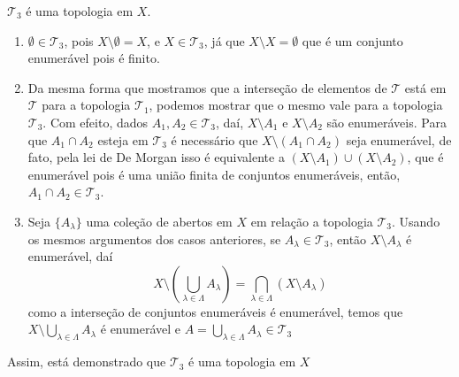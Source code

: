 \documentclass[a4paper, 11pt]{article}
\newcommand{\cT}{\mathcal T}
\begin{document}
\pagebreak
$\cT_3$ é uma topologia em $X$.
\begin{enumerate}[leftmargin=*]
    \item $\emptyset \in \cT_3$, pois $X \setminus \emptyset = X$, e $X \in \cT_3$, já que $X \setminus X = \emptyset$ que é um conjunto enumerável pois é finito.
    
    \item Da mesma forma que mostramos que a interseção de elementos de $\cT$ está em $\cT$ para a topologia $\cT_1$, podemos mostrar que o mesmo vale para a topologia $\cT_3$.
    Com efeito, dados $A_1, A_2 \in \cT_3$, daí, $X \setminus A_1$ e $X \setminus A_2$ são enumeráveis. 
    Para que $A_1 \cap A_2$ esteja em $\cT_3$ é necessário que $X \setminus (A_1 \cap A_2)$ seja enumerável, de fato, pela lei de De Morgan isso é equivalente a $(X \setminus A_1) \cup (X \setminus A_2)$, que é enumerável pois é uma união finita de conjuntos enumeráveis, então, $A_1 \cap A_2 \in \cT_3$.

    \item Seja $\{A_\lambda\}$ uma coleção de abertos em $X$ em relação a topologia $\cT_3$.
    Usando os mesmos argumentos dos casos anteriores, se $A_\lambda \in \cT_3$, então $X \setminus A_\lambda$ é enumerável, daí
    \[
        X \setminus \left(\bigcup_{\lambda \in \Lambda} A_\lambda \right) = \bigcap_{\lambda \in \Lambda} \left( X \setminus A_\lambda \right)
    \]
    como a interseção de conjuntos enumeráveis é enumerável, temos que $X \setminus \bigcup_{\lambda \in \Lambda} A_\lambda$ é enumerável e $A = \bigcup_{\lambda \in \Lambda} A_\lambda \in \cT_3$
\end{enumerate}
Assim, está demonstrado que $\cT_3$ é uma topologia em $X$
\end{document}

